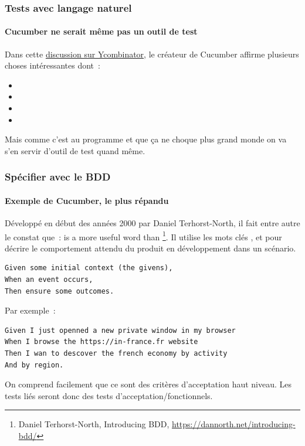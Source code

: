\documentclass{beamer}
\begin{document}
    \begin{frame}
        \frametitle{Tests avec langage naturel}
        \framesubtitle{Cucumber ne serait même pas un outil de test}
        \transdissolve
        Dans cette \href{https://news.ycombinator.com/item?id=10194242}{discussion sur Ycombinator}, le créateur de Cucumber affirme plusieurs choses intéressantes dont~:
        \begin{itemize}
            \item {}
            \item {}
            \item {}
            \item {}
        \end{itemize}
        Mais comme c'est au programme et que ça ne choque plus grand monde on va s'en servir d'outil de test quand même. 
    \end{frame}

    \begin{frame}[fragile]
        \frametitle{Spécifier avec le BDD}
        \framesubtitle{Exemple de Cucumber, le plus répandu}
        \transdissolve
        Développé en début des années 2000 par Daniel Terhorst-North, il fait entre autre le constat que~:  is a more useful word than \footnote{Daniel Terhorst-North, Introducing BDD, \url{https://dannorth.net/introducing-bdd/}}.
        \bigbreak
        Il utilise les mots clés ,  et  pour décrire le comportement attendu du produit en développement dans un scénario.
        \begin{lstlisting}
Given some initial context (the givens),
When an event occurs,
Then ensure some outcomes.
        \end{lstlisting}

        Par exemple~:
        \begin{lstlisting}
Given I just openned a new private window in my browser
When I browse the https://in-france.fr website
Then I wan to descover the french economy by activity
And by region.
        \end{lstlisting}

        On comprend facilement que ce sont des critères d'acceptation haut niveau.
        Les tests liés seront donc des tests d'acceptation/fonctionnels.
    \end{frame}
\end{document}
